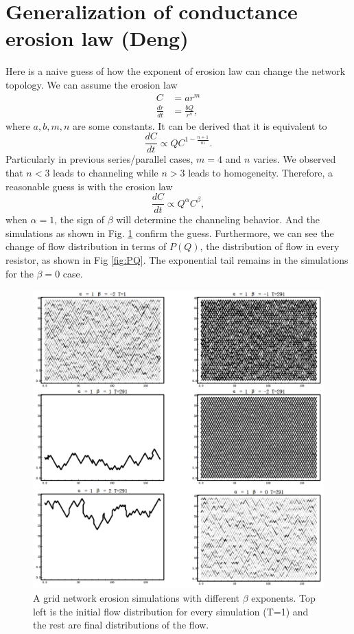 \section{Generalization of conductance erosion law (Deng)}
Here is a naive guess of how the exponent of erosion law can change the network topology. We can assume the erosion law  
\begin{align}
    C &= a r^m \\
    \frac{dr}{dt} &= \frac{b Q}{r^n},
\end{align}
where $a,b,m,n$ are some constants. It can be derived that it is equivalent to
\begin{equation}
    \frac{dC}{dt} \propto QC^{1-\frac{n+1}{m}}.
\end{equation}
Particularly in previous series/parallel cases, $m=4$ and $n$ varies. We observed that $n<3$ leads to channeling while $n>3$ leads to homogeneity. Therefore, a reasonable guess is with the erosion law 
\begin{equation}
    \frac{dC}{dt} \propto Q^\alpha C^\beta,
\end{equation}
when $\alpha = 1$, the sign of $\beta$ will determine the channeling behavior. And the simulations as shown in Fig. \ref{fig:erosionExp} confirm the guess. Furthermore, we can see the change of flow distribution in terms of $P(Q)$, the distribution of flow in every resistor, as shown in Fig \ref{fig:PQ}. The exponential tail remains in the simulations for the $\beta = 0$ case.
\begin{figure}[h]
  \centerline{\includegraphics[width=1\textwidth]{./Figs/erosionExp.png}}
  \caption{A grid network erosion simulations with different $\beta$ exponents. Top left is the initial flow distribution for every simulation (T=1) and the rest are final distributions of the flow.}
\label{fig:erosionExp}
\end{figure}  

